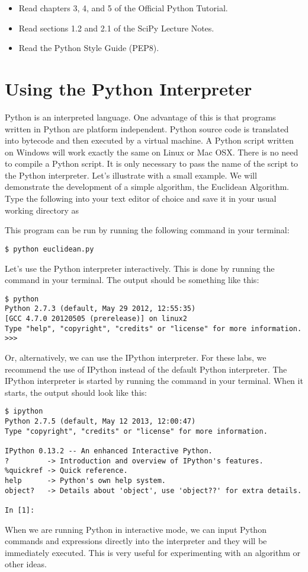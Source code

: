 \begin{problem}
\begin{itemize}
\item Read chapters 3, 4, and 5 of the Official Python Tutorial.
\item Read sections 1.2 and 2.1 of the SciPy Lecture Notes.
\item Read the Python Style Guide (PEP8).
\end{itemize}
\end{problem}

\section*{Using the Python Interpreter}
Python is an interpreted language.
One advantage of this is that programs written in Python are platform independent. 
Python source code is translated into bytecode and then executed by a virtual machine.
A Python script written on Windows will work exactly the same on Linux or Mac OSX.
There is no need to compile a Python script.
It is only necessary to pass the name of the script to the Python interpreter. 
Let's illustrate with a small example.
We will demonstrate the development of a simple algorithm, the Euclidean Algorithm.
Type the following into your text editor of choice and save it in your usual working directory as 

This program can be run by running the following command in your terminal:
\begin{lstlisting}
$ python euclidean.py
\end{lstlisting}

Let's use the Python interpreter interactively.
This is done by running the command  in your terminal.
The output should be something like this:
\begin{lstlisting}
$ python
Python 2.7.3 (default, May 29 2012, 12:55:35) 
[GCC 4.7.0 20120505 (prerelease)] on linux2
Type "help", "copyright", "credits" or "license" for more information.
>>> 
\end{lstlisting}
Or, alternatively, we can use the IPython interpreter.  
For these labs, we recommend the use of IPython instead of the default Python interpreter.
The IPython interpreter is started by running the command  in your terminal.
When it starts, the output should look like this:
\begin{lstlisting}
$ ipython
Python 2.7.5 (default, May 12 2013, 12:00:47) 
Type "copyright", "credits" or "license" for more information.

IPython 0.13.2 -- An enhanced Interactive Python.
?         -> Introduction and overview of IPython's features.
%quickref -> Quick reference.
help      -> Python's own help system.
object?   -> Details about 'object', use 'object??' for extra details.

In [1]: 
\end{lstlisting}
When we are running Python in interactive mode, we can input Python commands and expressions directly into the interpreter and they will be immediately executed. 
This is very useful for experimenting with an algorithm or other ideas.

